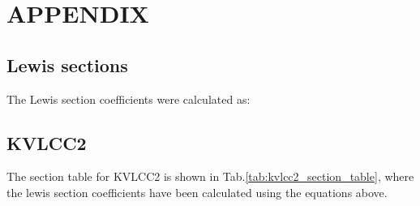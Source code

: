 \section*{APPENDIX}\label{appendix}
\subsection*{Lewis sections}\label{lewis-sections}
The Lewis section coefficients were calculated as:
\subsection*{KVLCC2}\label{kvlcc2}
The section table for KVLCC2 is shown in
Tab.\ref{tab:kvlcc2_section_table}, where the lewis section
coefficients have been calculated using the equations above.
